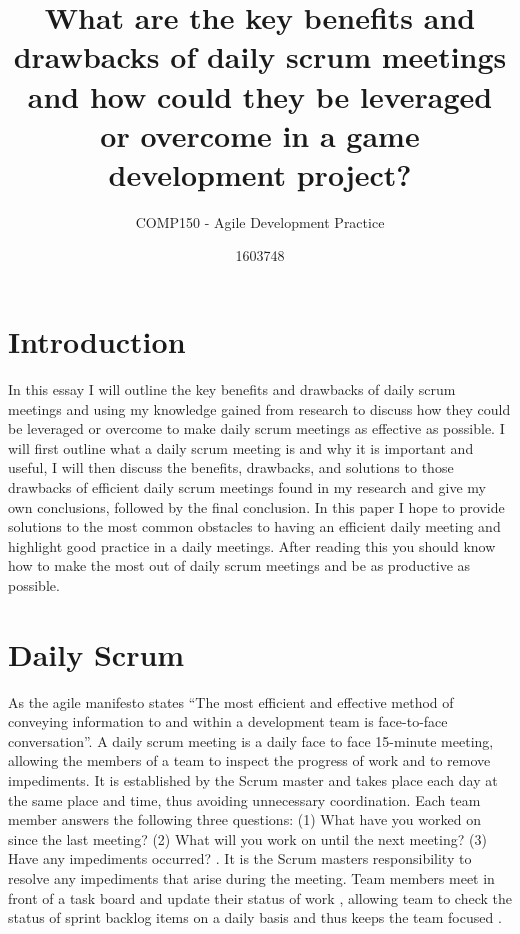 \documentclass{scrartcl}
\title{What are the key benefits and drawbacks of daily scrum meetings and how could they be leveraged or overcome in a game development project?}
\subtitle{COMP150 - Agile Development Practice}
\author{1603748}
\begin{document}
\maketitle


\section{Introduction}

\cite{Manifesto,SupportingScrum,ScrumEveryDay,Obstacles,Distributed,Multitouch,SoftwareProjects} 
In this essay I will outline the key benefits and drawbacks of daily scrum meetings and using my knowledge gained from research to discuss how they could be leveraged or overcome to make daily scrum meetings as effective as possible. I will first outline what a daily scrum meeting is and why it is important and useful, I will then discuss the benefits, drawbacks, and solutions to those drawbacks of efficient daily scrum meetings found in my research and give my own conclusions, followed by the final conclusion. In this paper I hope to provide solutions to the most common obstacles to having an efficient daily meeting and highlight good practice in a daily meetings. After reading this you should know how to make the most out of daily scrum meetings and be as productive as possible.

\section{Daily Scrum}

As the agile manifesto \cite{Manifesto} states ``The most efficient and effective method of 
conveying information to and within a development 
team is face-to-face conversation''. A daily scrum meeting is a daily face to face 15-minute meeting, allowing the members of a team to inspect the progress of work and to remove impediments. It is established by the Scrum master and takes place each day at the same place and time, thus avoiding unnecessary coordination. Each team member answers the following three questions: (1) What have you worked on since the last meeting? (2) What will you work on until the next meeting? (3) Have any impediments occurred? \cite{ScrumEveryDay}. It is the Scrum masters responsibility to resolve any impediments that arise during the meeting. Team members meet in front of a task board and update their status of work \cite{Multitouch}, allowing team to check the status of sprint backlog items on a daily basis and thus keeps the team focused \cite{ScrumEveryDay}.
\end{document}
